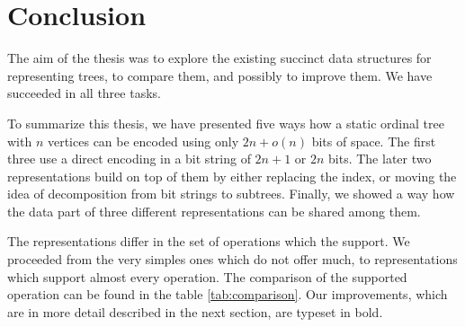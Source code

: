 \chapter*{Conclusion}
\setcounter{chapter}{\thechapter+1}

The aim of the thesis was to explore the existing succinct data structures for representing trees, to compare them, and possibly to improve them.
We have succeeded in all three tasks.

\bigbreak

To summarize this thesis, we have presented five ways how a static ordinal tree with $n$ vertices can be encoded using only $2n + o(n)$ bits of space.
The first three use a direct encoding in a bit string of $2n + 1$ or $2n$ bits.
The later two representations build on top of them by either replacing the index, or moving the idea of decomposition from bit strings to subtrees.
Finally, we showed a way how the data part of three different representations can be shared among them.

The representations differ in the set of operations which the support.
We proceeded from the very simples ones which do not offer much, to representations which support almost every operation.
The comparison of the supported operation can be found in the table \ref{tab:comparison}.
Our improvements, which are in more detail described in the next section, are typeset in bold.

